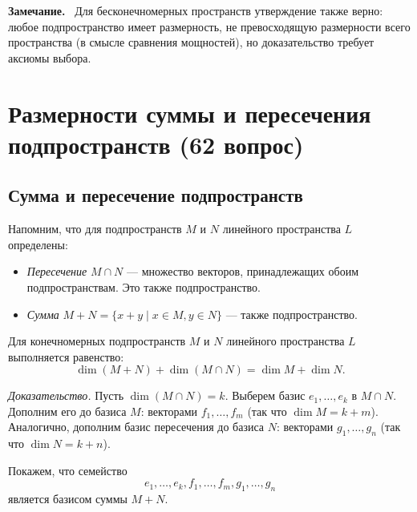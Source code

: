 \documentclass[a4paper,12pt]{article}
\newcommand{\myremark}{\textbf{Замечание.}\ }
\theoremstyle{definition}
\theoremstyle{plain}
\theoremstyle{remark}
\begin{document}
	\myremark
	Для бесконечномерных пространств утверждение также верно: любое подпространство имеет размерность, не превосходящую размерности всего пространства (в смысле сравнения мощностей), но доказательство требует аксиомы выбора.
	
	
	
	
	
	
	
	\newpage
	\section{Размерности суммы и пересечения подпространств (62 вопрос)}
	
	\subsection{Сумма и пересечение подпространств}
	
	Напомним, что для подпространств \( M \) и \( N \) линейного пространства \( L \) определены:
	\begin{itemize}
		\item \textit{Пересечение} \( M \cap N \) — множество векторов, принадлежащих обоим подпространствам. Это также подпространство.
		\item \textit{Сумма} \( M + N = \{ x + y \mid x \in M, y \in N \} \) — также подпространство.
	\end{itemize}
	
	\begin{tcolorbox}[colback=blue!5, colframe=blue!40!black, title=Теорема (Формула Грассмана)]
		Для конечномерных подпространств \( M \) и \( N \) линейного пространства \( L \) выполняется равенство:
		\[
		\dim(M + N) + \dim(M \cap N) = \dim M + \dim N.
		\]
	\end{tcolorbox}
	
	\medskip
	\textit{Доказательство.}
	Пусть \( \dim(M \cap N) = k \). Выберем базис \( e_1, \dots, e_k \) в \( M \cap N \). Дополним его до базиса \( M \): векторами \( f_1, \dots, f_m \) (так что \( \dim M = k + m \)). Аналогично, дополним базис пересечения до базиса \( N \): векторами \( g_1, \dots, g_n \) (так что \( \dim N = k + n \)).
	
	Покажем, что семейство
	\[
	e_1, \dots, e_k, f_1, \dots, f_m, g_1, \dots, g_n
	\]
	является базисом суммы \( M + N \).
	
\end{document}

